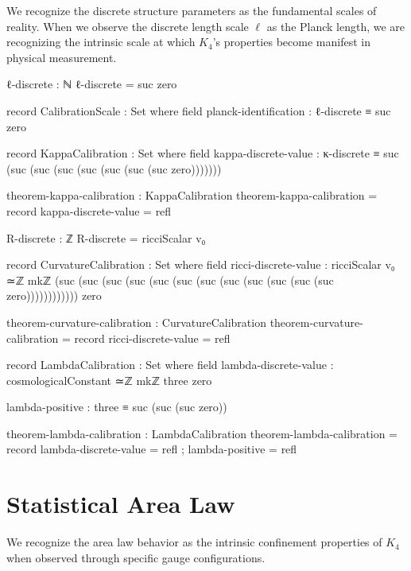 \documentclass[11pt,a4paper]{book}
\begin{document}
We recognize the discrete structure parameters as the fundamental scales of reality. When we observe the discrete length scale $\ell$ as the Planck length, we are recognizing the intrinsic scale at which $K_4$'s properties become manifest in physical measurement.

\begin{code}
ℓ-discrete : ℕ
ℓ-discrete = suc zero

record CalibrationScale : Set where
  field
    planck-identification : ℓ-discrete ≡ suc zero
    
record KappaCalibration : Set where
  field
    kappa-discrete-value : κ-discrete ≡ suc (suc (suc (suc (suc (suc (suc (suc zero)))))))
    
theorem-kappa-calibration : KappaCalibration
theorem-kappa-calibration = record
  { kappa-discrete-value = refl
  }

R-discrete : ℤ
R-discrete = ricciScalar v₀

record CurvatureCalibration : Set where
  field
    ricci-discrete-value : ricciScalar v₀ ≃ℤ mkℤ (suc (suc (suc (suc (suc (suc (suc 
                            (suc (suc (suc (suc (suc zero)))))))))))) zero
    
theorem-curvature-calibration : CurvatureCalibration
theorem-curvature-calibration = record
  { ricci-discrete-value = refl
  }

record LambdaCalibration : Set where
  field
    lambda-discrete-value : cosmologicalConstant ≃ℤ mkℤ three zero
    
    lambda-positive : three ≡ suc (suc (suc zero))

theorem-lambda-calibration : LambdaCalibration
theorem-lambda-calibration = record
  { lambda-discrete-value = refl
  ; lambda-positive = refl
  }
\end{code}

\section{Statistical Area Law}

We recognize the area law behavior as the intrinsic confinement properties of $K_4$ when observed through specific gauge configurations.
\end{document}
